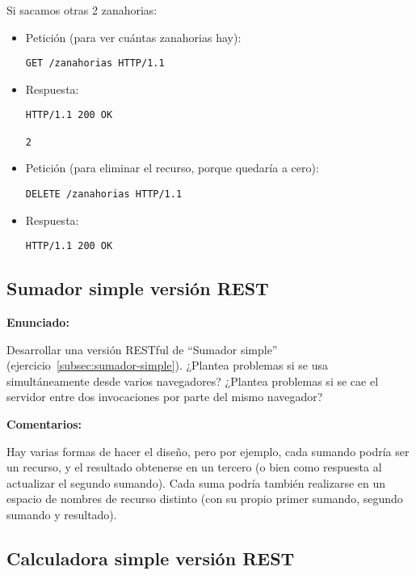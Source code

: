 Si sacamos otras 2 zanahorias:

\begin{itemize}
\item Petición (para ver cuántas zanahorias hay):
\begin{verbatim}
GET /zanahorias HTTP/1.1
\end{verbatim}

\item Respuesta:
\begin{verbatim}
HTTP/1.1 200 OK

2
\end{verbatim}

\item Petición (para eliminar el recurso, porque quedaría a cero):
\begin{verbatim}
DELETE /zanahorias HTTP/1.1
\end{verbatim}

\item Respuesta:
\begin{verbatim}
HTTP/1.1 200 OK
\end{verbatim}

\end{itemize}



\subsection{Sumador simple versión REST}
\label{subsec:sumador-simple-rest}

\textbf{Enunciado:}

Desarrollar una versión RESTful de ``Sumador simple'' (ejercicio~\ref{subsec:sumador-simple}). ¿Plantea problemas si se usa simultáneamente desde varios navegadores? ¿Plantea problemas si se cae el servidor entre dos invocaciones por parte del mismo navegador?

\textbf{Comentarios:}

Hay varias formas de hacer el diseño, pero por ejemplo, cada sumando podría ser un recurso, y el resultado obtenerse en un tercero (o bien como respuesta al actualizar el segundo sumando). Cada suma podría también realizarse en un espacio de nombres de recurso distinto (con su propio primer sumando, segundo sumando y resultado).


\subsection{Calculadora simple versión REST}
\label{subsec:calc-simple-rest}

